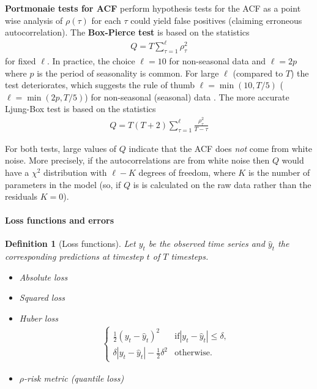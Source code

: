 \documentclass[12pt,a4paper]{article}
\newtheorem{definition}{Definition}
\begin{document}
\textbf{Portmonaie tests for ACF} perform  hypothesis tests for the ACF as a point wise analysis of $\rho(\tau)$ for each $\tau$ could yield false positives (claiming erroneous autocorrelation). The \textbf{Box-Pierce test} is based on the statistics
\begin{align}
	Q = T \sum _{\tau=1}^\ell\rho_\tau^2
\end{align}
for fixed $\ell$. In practice, the choice $\ell=10$ for non-seasonal data and $\ell=2p$ where $p$ is the period of seasonality is common. For large $\ell$ (compared to $T$) the test deteriorates, which suggests the rule of thumb $\ell=\min(10, T/5)$ ($\ell=\min(2p, T/5)$) for non-seasonal (seasonal) data \cite{hyndman_forecasting_principles_2018}.
The more accurate Ljung-Box test is based on the statistics
\begin{align}
Q = T (T+2) \sum _{\tau=1}^\ell\frac{\rho_\tau^2}{T-\tau}
\end{align}

For both tests, large values of $Q$ indicate that the ACF does \textit{not} come from white noise. More precisely, if the autocorrelations are from white noise then $Q$ would have a $\chi^2$ distribution with $\ell - K$ degrees of freedom, where $K$ is the number of parameters in the model (so, if $Q$ is is calculated on the raw data rather than the residuals $K=0$). 
\paragraph{Loss functions and errors}
\begin{definition}[Loss functions]
	Let $y_t$ be the observed time series and  $\hat y_t$ the corresponding predictions at timestep $t$  of $T$ timesteps.
	\begin{itemize}
		\item Absolute loss
		\item Squared loss
		\item Huber loss
		\begin{align} 
		\begin{cases}
		\frac{1}{2}(y_t-\hat y_t)^2 &  \text{if} \left | y_t - \hat y_t\right | \leq \delta, \\
		\delta \left | y_t - \hat y_t\right |  - \frac{1}{2} \delta^2& \text{otherwise.}
		\end{cases}	
		\end{align}
		\item $\rho$-risk metric (quantile loss) \cite{amazon_bayesian_2016}
	\end{itemize}
	
\end{definition}
\end{document}
